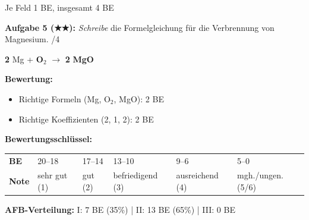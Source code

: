\documentclass[11pt, a4paper]{article}
\newcommand{\punkte}[1]{\hfill\textcolor{mittelgrau}{/#1}}
\newcommand{\lsg}[1]{\textcolor{loesung}{\textbf{#1}}}
\begin{document}
{\small\textcolor{loesung}{Je Feld 1 BE, insgesamt 4 BE}}

\vspace{0.5em}


\textbf{Aufgabe 5 (★★):} \textit{Schreibe} die Formelgleichung für die Verbrennung von Magnesium. \punkte{4}

\vspace{0.3em}
\hspace{2em} \lsg{2} Mg + \lsg{O$_2$} $\longrightarrow$ \lsg{2} \lsg{MgO}

\vspace{0.3em}
\textcolor{loesung}{%
\textbf{Bewertung:}
\begin{itemize}[leftmargin=1.5em, itemsep=1pt]
    \item Richtige Formeln (Mg, O$_2$, MgO): 2 BE
    \item Richtige Koeffizienten (2, 1, 2): 2 BE
\end{itemize}
}

\vspace{1em}


\begin{tcolorbox}[colback=hellgrau, colframe=chemie, boxrule=1pt, arc=0pt, left=8pt, right=8pt, top=6pt, bottom=6pt]
\textbf{Bewertungsschlüssel:}

\begin{tabular}{@{}llllll@{}}
\textbf{BE} & 20--18 & 17--14 & 13--10 & 9--6 & 5--0 \\
\textbf{Note} & sehr gut (1) & gut (2) & befriedigend (3) & ausreichend (4) & mgh./ungen. (5/6)
\end{tabular}

\vspace{0.5em}
\textbf{AFB-Verteilung:} I: 7 BE (35\%) | II: 13 BE (65\%) | III: 0 BE
\end{tcolorbox}
\end{document}
